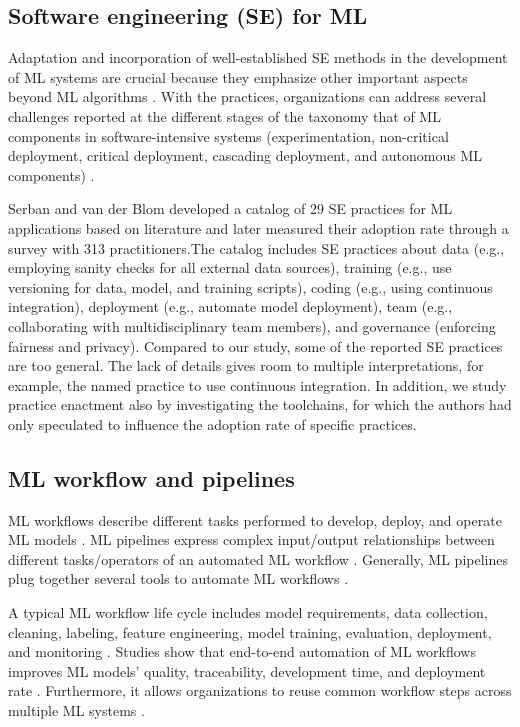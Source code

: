 
\subsection{Software engineering (SE) for ML}
Adaptation and incorporation of well-established SE methods in the development of ML systems are crucial \cite{Amershi2019}because they emphasize other important \DIFaddbegin {}\DIFaddend aspects beyond ML algorithms \cite{Sculley2015}. With the practices, organizations can address several challenges reported at the different stages of the taxonomy that \DIFdelbegin {}\DIFdelend \DIFaddbegin {}\DIFaddend of ML components in software-intensive systems (experimentation, non-critical deployment, critical deployment, cascading deployment, and autonomous ML components) \cite{Lwakatare2019}.

Serban and van der Blom \cite{Serban2020Practices} developed a catalog of 29 SE practices for ML applications based on literature and later measured their adoption rate through a survey with 313 practitioners.The catalog includes SE practices about data (e.g., employing sanity checks for all external data sources), training (e.g., use versioning for data, model, and training scripts), coding (e.g., using continuous integration), deployment (e.g., automate model deployment), team (e.g., collaborating with multidisciplinary team members), and governance (enforcing fairness and privacy). Compared to our study, some of the reported SE practices are too general. The lack of details gives room to multiple interpretations, for example, the named practice to use continuous integration. In addition, we study practice enactment also by investigating the toolchains, for which the authors \cite{Serban2020Practices} had only speculated to influence the adoption rate of specific practices. 

\subsection{ML workflow and pipelines}

ML workflows describe different tasks performed to develop, deploy, and operate ML models  \cite{Amershi2019}. ML pipelines express complex input/output relationships between different tasks/operators of an automated ML workflow \cite{Doris2021MLPipelines}. Generally, ML pipelines plug together several tools to automate ML workflows \cite{Hummer2019IBM}.

A typical ML workflow life cycle includes model requirements, data collection, cleaning, labeling, feature engineering, model training, evaluation, deployment, and monitoring  \cite{Amershi2019}. Studies show that end-to-end automation of ML workflows improves ML models’ quality, traceability, development time, and deployment rate  \cite{Doris2021MLPipelines, Hummer2019IBM}. Furthermore, it allows organizations to reuse common workflow steps across multiple ML systems \cite{Baylor2017, Hummer2019IBM}.

